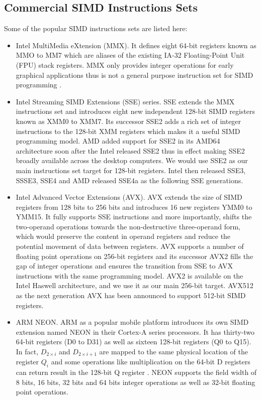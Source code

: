 \subsection{Commercial SIMD Instructions Sets}
Some of the popular SIMD instructions sets are listed here:
\begin{itemize}
  \item Intel MultiMedia eXtension (MMX). It defines eight 64-bit registers known as MMO to MM7 which are aliases of the existing IA-32 Floating-Point Unit (FPU) stack registers. MMX only provides integer operations for early graphical applications thus is not a general purpose instruction set for SIMD programming \cite{hua_idisa}.
  \item Intel Streaming SIMD Extensions (SSE) series. SSE extends the MMX instructions set and introduces eight new independent 128-bit SIMD registers known as XMM0 to XMM7. Its successor SSE2 adds a rich set of integer instructions to the 128-bit XMM registers which makes it a useful SIMD programming model. AMD added support for SSE2 in its AMD64 architecture soon after the Intel released SSE2 thus in effect making SSE2 broadly available across the desktop computers. We would use SSE2 as our main instructions set target for 128-bit registers. Intel then released SSE3, SSSE3, SSE4 and AMD released SSE4a as the following SSE generations.
  \item Intel Advanced Vector Extensions (AVX). AVX extends the size of SIMD registers from 128 bits to 256 bits and introduces 16 new registers YMM0 to YMM15. It fully supports SSE instructions and more importantly, shifts the two-operand operations towards the non-destructive three-operand form, which would preserve the content in operand registers and reduce the potential movement of data between registers. AVX supports a number of floating point operations on 256-bit registers and its successor AVX2 fills the gap of integer operations and ensures the transition from SSE to AVX instructions with the same programming model. AVX2 is available on the Intel Haswell architecture, and we use it as our main 256-bit target. AVX512 as the next generation AVX has been announced to support 512-bit SIMD registers.
  \item ARM NEON\@. ARM as a popular mobile platform introduces its own SIMD extension named NEON in their Cortex-A series processors. It has thirty-two 64-bit registers (D0 to D31) as well as sixteen 128-bit registers (Q0 to Q15). In fact, $D_{2 \times i}$ and $D_{2 \times i + 1}$ are mapped to the same physical location of the register $Q_i$ and some operations like multiplication on the 64-bit D registers can return result in the 128-bit Q register \cite{hua_idisa}. NEON supports the field width of 8 bits, 16 bits, 32 bits and 64 bits integer operations as well as 32-bit floating point operations.
\end{itemize}

